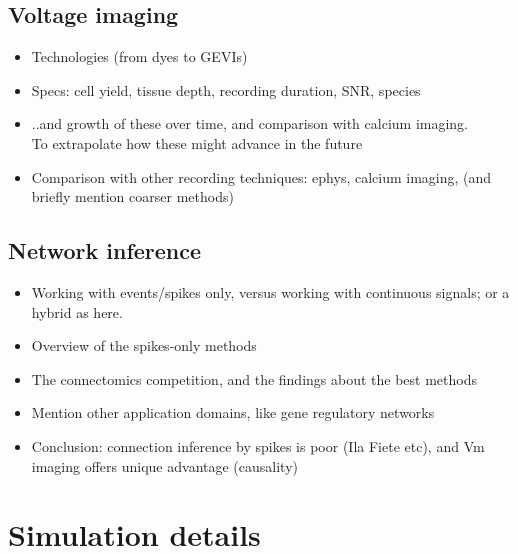 \documentclass[a4paper, oneside, 11pt]{memoir}
\begin{document}
\section{Voltage imaging}

\begin{itemize}
    \item Technologies (from dyes to GEVIs)
    \item Specs: cell yield, tissue depth, recording duration, SNR, species
    \item ..and growth of these over time, and comparison with calcium imaging.\\
        To extrapolate how these might advance in the future
    \item Comparison with other recording techniques: ephys, calcium imaging, (and briefly mention coarser methods)
\end{itemize}


\section{Network inference}

\begin{itemize}
    \item Working with events/spikes only, versus working with continuous signals; or a hybrid as here.
    \item Overview of the spikes-only methods
    \item The connectomics competition, and the findings about the best methods
    \item Mention other application domains, like gene regulatory networks
    \item Conclusion: connection inference by spikes is poor (Ila Fiete etc), and Vm imaging offers unique advantage (causality)
\end{itemize}




\chapter{Simulation details}
\label{ch2}
\end{document}
